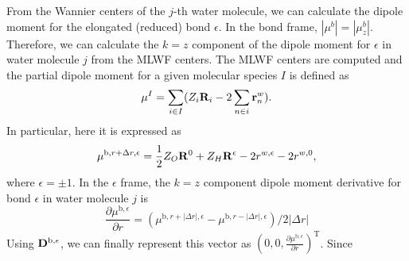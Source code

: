     From the Wannier centers of the $j$-th water molecule, we can calculate the dipole moment for the elongated (reduced) bond ${\epsilon}$. 
    In the bond frame, $|\mu^b| =|\mu^b_z|$. 
    Therefore, we can calculate the $k=z$ component of the dipole moment for ${\epsilon}$ in water molecule $j$ from the MLWF centers.\cite{Silvestrelli1999} 
      The MLWF centers are computed\cite{Silvestrelli1999} and the partial dipole moment for a given molecular species $I$ is defined as\cite{Salanne08}
      \begin{equation}
        \mu^I = \sum_{i\in I}(Z_i {\bf R}_i - 2\sum_{n\in i} {\bf r}^w_n).
      \end{equation}
In particular, here it is expressed as 
\begin{equation}
  \mu^{\text{b},r+\Delta r,\epsilon} = \frac{1}{2}Z_O {\bf R}^{0} +Z_H{\bf R}^{\epsilon} -2r^{w,\epsilon} -2r^{w,0},
\end{equation}
where $\epsilon=\pm 1$.
In the $\epsilon$ frame, the $k=z$ component dipole moment derivative for bond $\epsilon$ in water molecule $j$ is
        \begin{equation}
          \frac{\partial \mu^{\text{b},\epsilon}}{\partial r} = (\mu^{\text{b},r+|\Delta r|,\epsilon}-\mu^{\text{b},r-|\Delta r|,\epsilon})/2|\Delta r|
        \end{equation}
        Using ${\bf D}^{\text{b},\epsilon}$, we can finally represent this vector as $( 0, 0, \frac{\partial \mu^{\text{b},\epsilon}}{\partial r} )^\text{T}$.
        Since
